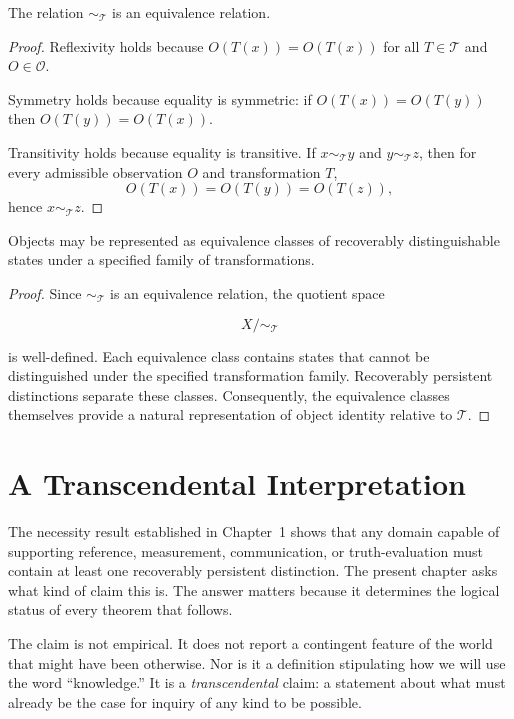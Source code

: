\documentclass[12pt,oneside]{article}
\theoremstyle{definition}
\begin{document}
\begin{proposition}
The relation \(\sim_{\mathcal{T}}\) is an equivalence relation.
\end{proposition}

\begin{proof}
Reflexivity holds because \(O(T(x)) = O(T(x))\) for all \(T \in \mathcal{T}\) and \(O \in \mathcal{O}\).

Symmetry holds because equality is symmetric: if \(O(T(x)) = O(T(y))\) then \(O(T(y)) = O(T(x))\).

Transitivity holds because equality is transitive. If \(x \sim_{\mathcal{T}} y\) and \(y \sim_{\mathcal{T}} z\), then for every admissible observation \(O\) and transformation \(T\),
\[
O(T(x)) = O(T(y)) = O(T(z)),
\]
hence \(x \sim_{\mathcal{T}} z\).
\end{proof}


\begin{corollary}
Objects may be represented as equivalence classes of recoverably distinguishable states under a specified family of transformations.
\end{corollary}

\begin{proof}
Since \(\sim_{\mathcal{T}}\) is an equivalence relation, the quotient space

\[
X/{\sim_{\mathcal{T}}}
\]

is well-defined. Each equivalence class contains states that cannot be distinguished under the specified transformation family. Recoverably persistent distinctions separate these classes. Consequently, the equivalence classes themselves provide a natural representation of object identity relative to \(\mathcal{T}\).
\end{proof}

\section{A Transcendental Interpretation}

The necessity result established in Chapter~1 shows that any domain capable of
supporting reference, measurement, communication, or truth-evaluation must contain
at least one recoverably persistent distinction. The present chapter asks what
kind of claim this is. The answer matters because it determines the logical status
of every theorem that follows.

The claim is not empirical. It does not report a contingent feature of the world
that might have been otherwise. Nor is it a definition stipulating how we will use
the word ``knowledge.'' It is a \emph{transcendental} claim: a statement about what
must already be the case for inquiry of any kind to be possible.
\end{document}
